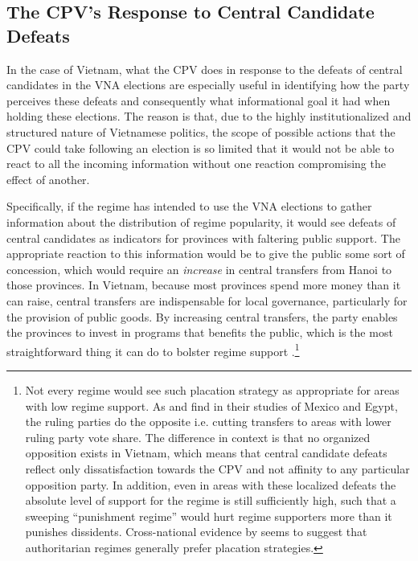 \documentclass[12pt]{article}
\newcommand\fnote[1]{\footnote{\baselineskip=2\normalbaselineskip#1}}
\newcommand{\1}{\mathbbm{1}}
\begin{document}


\subsection{The CPV's Response to Central Candidate Defeats}
\label{sec:vietnam_local_defeat}

In the case of Vietnam, what the CPV does in response to the defeats of central candidates in the VNA elections are especially useful in identifying how the party perceives these defeats and consequently what informational goal it had when holding these elections. The reason is that, due to the highly institutionalized and structured nature of Vietnamese politics, the scope of possible actions that the CPV could take following an election is so limited that it would not be able to react to all the incoming information without one reaction compromising the effect of another.

Specifically, if the regime has intended to use the VNA elections to gather information about the distribution of regime popularity, it would see defeats of central candidates as indicators for provinces with faltering public support. The appropriate reaction to this information would be to give the public some sort of concession, which would require an \textit{increase} in central transfers from Hanoi to those provinces. In Vietnam, because most provinces spend more money than it can raise, central transfers are indispensable for local governance, particularly for the provision of public goods. By increasing central transfers, the party enables the provinces to invest in programs that benefits the public, which is the most straightforward thing it can do to bolster regime support .\fnote{Not every regime would see such placation strategy as appropriate for areas with low regime support. As \citet{Magaloni2006} and \citet{Blaydes2010} find in their studies of Mexico and Egypt, the ruling parties do the opposite i.e. cutting transfers to areas with lower ruling party vote share. The difference in context is that no organized opposition exists in Vietnam, which means that central candidate defeats reflect only dissatisfaction towards the CPV and not affinity to any particular opposition party. In addition, even in areas with these localized defeats the absolute level of support for the regime is still sufficiently high, such that a sweeping ``punishment regime'' \citep{Magaloni2006} would hurt regime supporters more than it punishes dissidents.  Cross-national evidence by \citet{Miller2015} seems to suggest that authoritarian regimes generally prefer placation strategies.}
\end{document}

